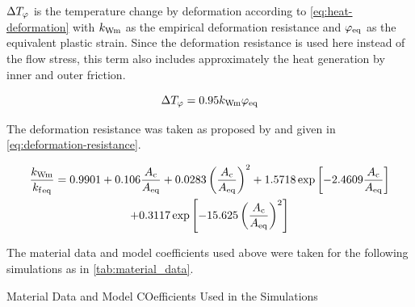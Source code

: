 \noindent$\Delta{T}_{{\varphi}}$ is the temperature change by deformation according to \autoref{eq:heat-deformation} with ${k_\mathrm{Wm}}$ as the empirical deformation resistance and ${{{\varphi}}_\mathrm{eq}}$ as the equivalent plastic strain.
Since the deformation resistance is used here instead of the flow stress, this term also includes approximately the heat generation by inner and outer friction.

\begin{equation}
    \Delta{T}_{{\varphi}} = \num{0.95} {k_\mathrm{Wm}} {{{\varphi}}_\mathrm{eq}}
    \label{eq:heat-deformation}
\end{equation}

The deformation resistance was taken as proposed by \textcite{Hensel1978} and given in \autoref{eq:deformation-resistance}.

\begin{multline}
    \frac{{k_\mathrm{Wm}}}{{{{k_\mathrm{f}}}_\mathrm{eq}}} = \num{0.9901} + \num{0.106} \frac{{A_\mathrm{c}}}{{{{A}}_\mathrm{eq}}} + \num{0.0283} \left( \frac{{A_\mathrm{c}}}{{{{A}}_\mathrm{eq}}} \right)^2 + \num{1.5718} \exp \left[ \num{-2.4609} \frac{{A_\mathrm{c}}}{{{{A}}_\mathrm{eq}}} \right] \\
    + \num{0.3117} \exp \left[ \num{-15.625} \left( \frac{{A_\mathrm{c}}}{{{{A}}_\mathrm{eq}}} \right)^2 \right]
    \label{eq:deformation-resistance}
\end{multline}

The material data and model coefficients used above were taken for the following simulations as in \autoref{tab:material_data}.

\begin{table}
    \centering
    \caption{Material Data and Model COefficients Used in the Simulations}
    \label{tab:material_data}
    
\end{table}

